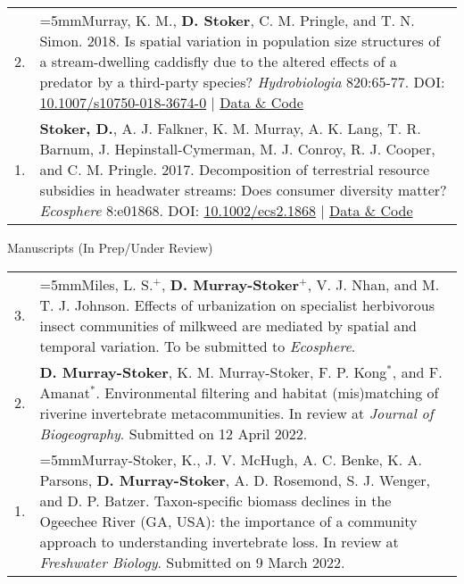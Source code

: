 \documentclass[letterpaper,11pt,oneside]{article}
\begin{document}
\begin{longtable}{@{} p{0.5cm} >{\raggedright\arraybackslash}p{16.7cm}}
2. & \hangindent=5mmMurray, K. M., \textbf{D. Stoker}, C. M. Pringle, and T. N. Simon. 2018. Is spatial variation in population size structures of a stream-dwelling caddisfly due to the altered effects of a predator by a third-party species? \textit{Hydrobiologia} 820:65-77. DOI: {\href{https://link.springer.com/article/10.1007/s10750-018-3674-0}{10.1007/s10750-018-3674-0}} | {\href{https://figshare.com/articles/dataset/Phylloicus_hansoni_larval_population_size_structures_in_both_predator-only_and_predator-third_party_stream_settings/5856651}{Data \& Code}} \\
1. & \hangindent=5mm\textbf{Stoker, D.}, A. J. Falkner, K. M. Murray, A. K. Lang, T. R. Barnum, J. Hepinstall-Cymerman, M. J. Conroy, R. J. Cooper, and C. M. Pringle. 2017. Decomposition of terrestrial resource subsidies in headwater streams: Does consumer diversity matter? \textit{Ecosphere} 8:e01868. DOI: {\href{https://esajournals.onlinelibrary.wiley.com/doi/full/10.1002/ecs2.1868}{10.1002/ecs2.1868}} | {\href{https://figshare.com/articles/dataset/Decomposition_of_terrestrial_resource_subsidies_in_headwater_streams_Does_consumer_diversity_matter_/6025811}{Data \& Code}} \\
\end{longtable}

\bigskip





\noindent\Large{Manuscripts (In Prep/Under Review)} 
\normalsize
\bigskip

\def\arraystretch{1.4}
\noindent \begin{longtable}{@{} p{0.5cm} >{\raggedright\arraybackslash}p{16.7cm}}
3. & \hangindent=5mmMiles, L. S.$^{+}$, \textbf{D. Murray-Stoker}$^{+}$, V. J. Nhan, and M. T. J. Johnson. Effects of urbanization on specialist herbivorous insect communities of milkweed are mediated by spatial and temporal variation. To be submitted to \textit{Ecosphere}. \\
2. & \hangindent=5mm\textbf{D. Murray-Stoker}, K. M. Murray-Stoker, F. P. Kong$^{*}$, and F. Amanat$^{*}$. Environmental filtering and habitat (mis)matching of riverine invertebrate metacommunities. In review at \textit{Journal of Biogeography}. Submitted on 12 April 2022. \\
1. & \hangindent=5mmMurray-Stoker, K., J. V. McHugh, A. C. Benke, K. A. Parsons, \textbf{D. Murray-Stoker}, A. D. Rosemond, S. J. Wenger, and D. P. Batzer. Taxon-specific biomass declines in the Ogeechee River (GA, USA): the importance of a community approach to understanding invertebrate loss. In review at \textit{Freshwater Biology}. Submitted on 9 March 2022. \\
 \end{longtable}
\end{document}
